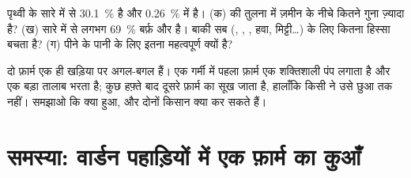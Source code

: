\begin{exercise}[$\star\star\star$]\label{exo:g6:water-underground:11}
पृथ्वी के सारे  में से 30.1~\%  है और 0.26~\%  में है।
(क)  की तुलना में ज़मीन के नीचे कितने गुना ज़्यादा  है? (ख) सारे
 में से लगभग 69~\% बर्फ़ और  है। बाकी सब (, , ,
हवा, मिट्टी\ldots) के लिए कितना हिस्सा बचता है? (ग) पीने के पानी के लिए 
इतना महत्वपूर्ण क्यों है?
\end{exercise}

\begin{exercise}[$\star\star\star$]\label{exo:g6:water-underground:12}
दो फ़ार्म एक ही खड़िया पर अगल-बगल हैं। एक गर्मी में पहला फ़ार्म एक शक्तिशाली
पंप लगाता है और एक बड़ा तालाब भरता है; कुछ हफ़्ते बाद दूसरे फ़ार्म का 
सूख जाता है, हालाँकि किसी ने उसे छुआ तक नहीं। समझाओ कि क्या हुआ, और दोनों
किसान क्या कर सकते हैं।
\end{exercise}

\section{समस्या: वार्डन पहाड़ियों में एक फ़ार्म का कुआँ}

